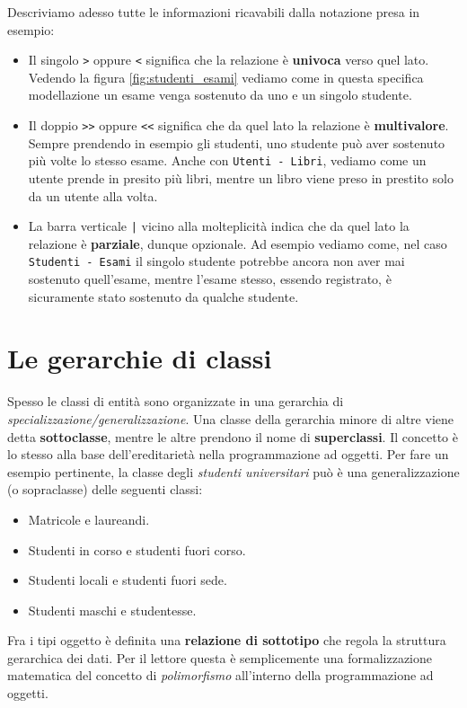 \documentclass[12pt]{report}
\begin{document}
	Descriviamo adesso tutte le informazioni ricavabili dalla notazione presa in esempio:
	\begin{itemize}
		\item Il singolo \texttt{>} oppure \texttt{<} significa che la relazione è \textbf{univoca} verso quel lato. Vedendo la figura \ref{fig:studenti_esami} vediamo come in questa specifica modellazione un esame venga sostenuto da uno e un singolo studente.
		
		\item Il doppio \texttt{>>} oppure \texttt{<<} significa che da quel lato la relazione è \textbf{multivalore}. Sempre prendendo in esempio gli studenti, uno studente può aver sostenuto più volte lo stesso esame. Anche con \texttt{Utenti - Libri}, vediamo come un utente prende in presito più libri, mentre un libro viene preso in prestito solo da un utente alla volta.
		
		\item La barra verticale \texttt{|} vicino alla molteplicità indica che da quel lato la relazione è \textbf{parziale}, dunque opzionale. Ad esempio vediamo come, nel caso \texttt{Studenti - Esami} il singolo studente potrebbe ancora non aver mai sostenuto quell'esame, mentre l'esame stesso, essendo registrato, è sicuramente stato sostenuto da qualche studente.
	\end{itemize}
	
	\section{Le gerarchie di classi}
	Spesso le classi di entità sono organizzate in una gerarchia di \textit{specializzazione/generalizzazione}. Una classe della gerarchia minore di altre viene detta \textbf{sottoclasse}, mentre le altre prendono il nome di \textbf{superclassi}. Il concetto è lo stesso alla base dell'ereditarietà nella programmazione ad oggetti.
	Per fare un esempio pertinente, la classe degli \textit{studenti universitari} può è una generalizzazione (o sopraclasse) delle seguenti classi:
	\begin{itemize}
		\item Matricole e laureandi.
		\item Studenti in corso e studenti fuori corso.
		\item Studenti locali e studenti fuori sede.
		\item Studenti maschi e studentesse.
	\end{itemize}
	
	Fra i tipi oggetto è definita una \textbf{relazione di sottotipo} che regola la struttura gerarchica dei dati.
	Per il lettore questa è semplicemente una formalizzazione matematica del concetto di \textit{polimorfismo} all'interno della programmazione ad oggetti.
	
\end{document}
